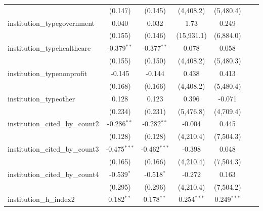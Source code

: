 \begin{tabular}{lcccccc}
                                         & (0.147)        & (0.145)        & (4,408.2)     & (5,480.4)     &     &   \\   
   institution\_typegovernment           & 0.040          & 0.032          & 1.73          & 0.249         &     &   \\   
                                         & (0.155)        & (0.146)        & (15,931.1)    & (6,884.0)     &     &   \\   
   institution\_typehealthcare           & -0.379$^{**}$  & -0.377$^{**}$  & 0.078         & 0.058         &     &   \\   
                                         & (0.155)        & (0.150)        & (4,408.2)     & (5,480.3)     &     &   \\   
   institution\_typenonprofit            & -0.145         & -0.144         & 0.438         & 0.413         &     &   \\   
                                         & (0.168)        & (0.166)        & (4,408.2)     & (5,480.4)     &     &   \\   
   institution\_typeother                & 0.128          & 0.123          & 0.396         & -0.071        &     &   \\   
                                         & (0.234)        & (0.231)        & (5,476.8)     & (4,709.4)     &     &   \\   
   institution\_cited\_by\_count2        & -0.286$^{**}$  & -0.282$^{**}$  & -0.004        & 0.445         &     &   \\   
                                         & (0.128)        & (0.128)        & (4,210.4)     & (7,504.3)     &     &   \\   
   institution\_cited\_by\_count3        & -0.475$^{***}$ & -0.462$^{***}$ & -0.398        & 0.048         &     &   \\   
                                         & (0.165)        & (0.166)        & (4,210.4)     & (7,504.3)     &     &   \\   
   institution\_cited\_by\_count4        & -0.539$^{*}$   & -0.518$^{*}$   & -0.272        & 0.163         &     &   \\   
                                         & (0.295)        & (0.296)        & (4,210.4)     & (7,504.2)     &     &   \\   
   institution\_h\_index2                & 0.182$^{**}$   & 0.178$^{**}$   & 0.254$^{***}$ & 0.249$^{***}$ &     &   \\   

\end{tabular}

